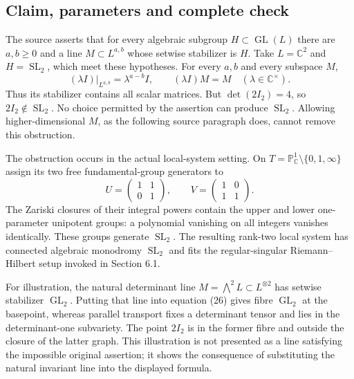 \documentclass[10pt]{article}
\begin{document}
\subsection*{Claim, parameters and complete check}
The source asserts that for every algebraic subgroup \(H\subset\operatorname{GL}(L)\) there are \(a,b\geq0\) and a line \(M\subset L^{a,b}\) whose setwise stabilizer is \(H\). Take \(L=\mathbb C^2\) and \(H=\operatorname{SL}_2\), which meet these hypotheses. For every \(a,b\) and every subspace \(M\), \[(\lambda I)|_{L^{a,b}}=\lambda^{a-b}I,\qquad
 (\lambda I)M=M\quad(\lambda\in\mathbb C^\times).\] Thus its stabilizer contains all scalar matrices. But \(\det(2I_2)=4\), so \(2I_2\notin\operatorname{SL}_2\). No choice permitted by the assertion can produce \(\operatorname{SL}_2\). Allowing higher-dimensional \(M\), as the following source paragraph does, cannot remove this obstruction.\par
The obstruction occurs in the actual local-system setting. On \(T=\mathbb P^1_\mathbb C\setminus\{0,1,\infty\}\) assign its two free fundamental-group generators to \[U=\begin{pmatrix}1&1\\0&1\end{pmatrix},\qquad
 V=\begin{pmatrix}1&0\\1&1\end{pmatrix}.\] The Zariski closures of their integral powers contain the upper and lower one-parameter unipotent groups: a polynomial vanishing on all integers vanishes identically. These groups generate \(\operatorname{SL}_2\). The resulting rank-two local system has connected algebraic monodromy \(\operatorname{SL}_2\) and fits the regular-singular Riemann–Hilbert setup invoked in Section 6.1.\par
For illustration, the natural determinant line \(M=\bigwedge^2L\subset L^{\otimes2}\) has setwise stabilizer \(\operatorname{GL}_2\). Putting that line into equation (26) gives fibre \(\operatorname{GL}_2\) at the basepoint, whereas parallel transport fixes a determinant tensor and lies in the determinant-one subvariety. The point \(2I_2\) is in the former fibre and outside the closure of the latter graph. This illustration is not presented as a line satisfying the impossible original assertion; it shows the consequence of substituting the natural invariant line into the displayed formula.\par
\end{document}
